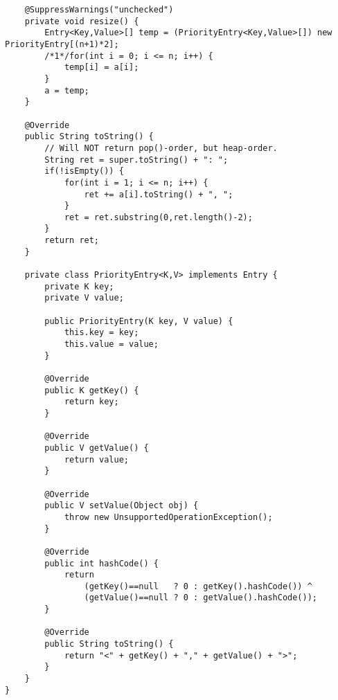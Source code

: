 \begin{lstlisting}
	@SuppressWarnings("unchecked")
	private void resize() {
		Entry<Key,Value>[] temp = (PriorityEntry<Key,Value>[]) new PriorityEntry[(n+1)*2];
		/*1*/for(int i = 0; i <= n; i++) {
			temp[i] = a[i];
		}
		a = temp;
	}

	@Override
	public String toString() {
		// Will NOT return pop()-order, but heap-order.
		String ret = super.toString() + ": ";
		if(!isEmpty()) {
			for(int i = 1; i <= n; i++) {
				ret += a[i].toString() + ", ";
			}
			ret = ret.substring(0,ret.length()-2);
		}
		return ret;
	}

	private class PriorityEntry<K,V> implements Entry {
		private K key;
		private V value;

		public PriorityEntry(K key, V value) {
			this.key = key;
			this.value = value;
		}

		@Override
		public K getKey() {
			return key;
		}

		@Override
		public V getValue() {
			return value;
		}

		@Override
		public V setValue(Object obj) {
			throw new UnsupportedOperationException();
		}

		@Override
		public int hashCode() {
			return
				(getKey()==null   ? 0 : getKey().hashCode()) ^
				(getValue()==null ? 0 : getValue().hashCode());
		}

		@Override
		public String toString() {
			return "<" + getKey() + "," + getValue() + ">";
		}
	}
}
\end{lstlisting}